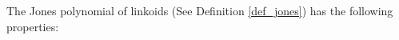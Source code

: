 \documentclass{article}
\newtheorem{proposition}{Proposition}[section]
\begin{document}
 
\noindent The Jones polynomial of linkoids (See Definition \ref{def_jones}) has the following properties:
\end{document}
